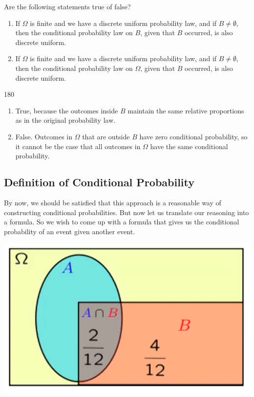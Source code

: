 \documentclass{tufte-handout}
\begin{document}
 Are the following statements true of false?
\begin{enumerate}
\item If $\Omega$ is finite and we have a discrete uniform probability law, and if $B \neq \emptyset$, then the conditional probability law on 
$B$, given that $B$ occurred, is also discrete uniform.
\item If $\Omega$ is finite and we have a discrete uniform probability law, and if $B \neq \emptyset$, then the conditional probability law on 
$\Omega$, given that $B$ occurred, is also discrete uniform.
\end{enumerate}

\vspace{3mm}
\begin{turn}{180} 
\color{teal}
\begin{minipage}{\linewidth}
\scriptsize
\begin{enumerate}[(1)]
\item True, because the outcomes inside $B$ maintain the same relative proportions as in the original probability law.
\item False. Outcomes in $\Omega$ that are outside $B$ have zero conditional probability, so it cannot be the case that 
all outcomes in $\Omega$ have the same conditional probability.
\end{enumerate}
\end{minipage}
\end{turn}


\subsection{Definition of Conditional Probability}\label{sec:DefCondProbs}


By now, we should be satisfied that this approach is a reasonable way of constructing conditional
probabilities. But now let us translate our reasoning into a formula. So we wish to come up with a
formula that gives us the conditional probability of an event given another event. 

\begin{marginfigure}
  \includegraphics{CondProbDefEg}
\end{marginfigure}
\end{document}
